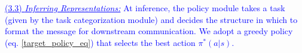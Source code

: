 \noindent \textcolor{blue}{\underline{(3.3) \emph{Inferring Representations:}}}
\textcolor{blue}{At inference, 
the policy module takes a task (given by the task categorization module) and decides the structure in which to format the message for downstream communication. We adopt a greedy policy (eq. \ref{target_policy_eq}) that selects the best action $\pi^*(a|s)$.}



